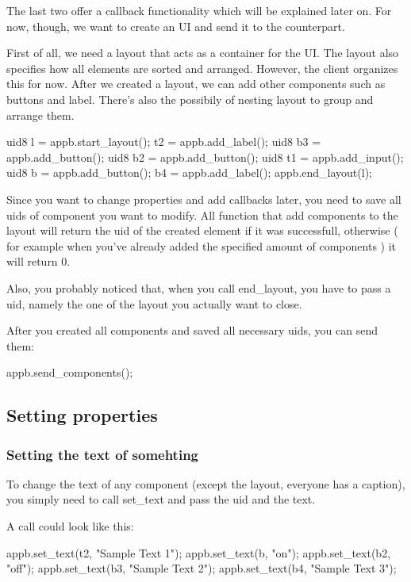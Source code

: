 The last two offer a callback functionality which will be explained later on. For now, though, we want to create an U\+I and send it to the counterpart.

First of all, we need a layout that acts as a container for the U\+I. The layout also specifies how all elements are sorted and arranged. However, the client organizes this for now. After we created a layout, we can add other components such as buttons and label. There's also the possibily of nesting layout to group and arrange them.


\begin{DoxyCode}
uid8 l = appb.start\_layout();
t2 = appb.add\_label();
uid8 b3 = appb.add\_button();
uid8 b2 = appb.add\_button();
uid8 t1 = appb.add\_input();
uid8 b = appb.add\_button();
b4 = appb.add\_label();
appb.end\_layout(l);
\end{DoxyCode}


Since you want to change properties and add callbacks later, you need to save all uids of component you want to modify. All function that add components to the layout will return the uid of the created element if it was successfull, otherwise ( for example when you've already added the specified amount of components ) it will return 0.

Also, you probably noticed that, when you call {\ttfamily end\+\_\+layout}, you have to pass a uid, namely the one of the layout you actually want to close.

After you created all components and saved all necessary uids, you can send them\+:


\begin{DoxyCode}
appb.send\_components();
\end{DoxyCode}


\subsection*{Setting properties}

\subsubsection*{Setting the text of somehting}

To change the text of any component (except the layout, everyone has a caption), you simply need to call {\ttfamily set\+\_\+text} and pass the uid and the text.

A call could look like this\+:


\begin{DoxyCode}
appb.set\_text(t2, \textcolor{stringliteral}{"Sample Text 1"});
appb.set\_text(b, \textcolor{stringliteral}{"on"});
appb.set\_text(b2, \textcolor{stringliteral}{"off"});
appb.set\_text(b3, \textcolor{stringliteral}{"Sample Text 2"});
appb.set\_text(b4, \textcolor{stringliteral}{"Sample Text 3"});
\end{DoxyCode}


